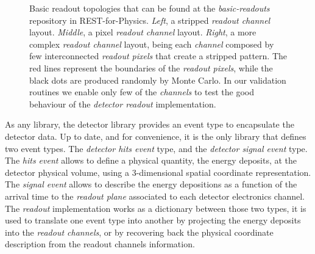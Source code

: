 \begin{figure}[htb!]
  \centering
	\caption{Basic readout topologies that can be found at the \emph{basic-readouts} repository in REST-for-Physics. \emph{Left}, a stripped \emph{readout channel} layout. \emph{Middle}, a pixel \emph{readout channel} layout. \emph{Right}, a more complex \emph{readout channel} layout, being each \emph{channel}  composed by few interconnected \emph{readout pixels} that create a stripped pattern. The red lines represent the boundaries of the \emph{readout pixels}, while the black dots are produced randomly by Monte Carlo. In our validation routines we enable only few of the \emph{channels} to test the good behaviour of the \emph{detector readout} implementation.  }\label{fig:readouts}
\end{figure}

As any library, the detector library provides an event type to encapsulate the detector data. Up to date, and for convenience, it is the only library that defines two event types. The \emph{detector hits event} type, and the \emph{detector signal event} type. The \emph{hits event} allows to define a physical quantity, the energy deposits, at the detector physical volume, using a 3-dimensional spatial coordinate representation. The \emph{signal event} allows to describe the energy depositions as a function of the arrival time to the \emph{readout plane} associated to each detector electronics channel. The \emph{readout} implementation works as a dictionary between those two types, it is used to translate one event type into another by projecting the energy deposits into the \emph{readout channels}, or by recovering back the physical coordinate description from the readout channels information.

